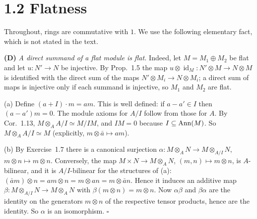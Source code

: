 \documentclass[11pt]{article}
\begin{document}
\section*{1.2 Flatness}

Throughout, rings are commutative with $1$. We use the following elementary fact, which is not stated in the text.

\textbf{(D)} \emph{A direct summand of a flat module is flat.} Indeed, let $M=M_1\oplus M_2$ be flat and let $u:N'\to N$ be injective. By Prop.~1.5 the map $u\otimes\operatorname{id}_M:N'\otimes M\to N\otimes M$ is identified with the direct sum of the maps $N'\otimes M_i\to N\otimes M_i$; a direct sum of maps is injective only if each summand is injective, so $M_1$ and $M_2$ are flat.

\pf
(a) Define $(a+I)\cdot m=am$. This is well defined: if $a-a'\in I$ then $(a-a')m=0$. The module axioms for $A/I$ follow from those for $A$. By Cor.~1.13, $M\otimes_A A/I\simeq M/IM$, and $IM=0$ because $I\subseteq \operatorname{Ann}(M)$. So $M\otimes_AA/I\simeq M$ (explicitly, $m\otimes \bar a\mapsto am$).

(b) By Exercise~1.7 there is a canonical surjection $\alpha:M\otimes_AN\to M\otimes_{A/I}N$, $m\otimes n\mapsto m\otimes n$. Conversely, the map $M\times N\to M\otimes_AN$, $(m,n)\mapsto m\otimes n$, is $A$-bilinear, and it is $A/I$-bilinear for the structures of (a): $(\bar a m)\otimes n=am\otimes n=m\otimes an=m\otimes \bar a n$. Hence it induces an additive map $\beta:M\otimes_{A/I}N\to M\otimes_AN$ with $\beta(m\otimes n)=m\otimes n$. Now $\alpha\beta$ and $\beta\alpha$ are the identity on the generators $m\otimes n$ of the respective tensor products, hence are the identity. So $\alpha$ is an isomorphism. \hfill$\square$
\end{document}
